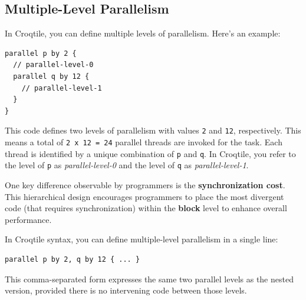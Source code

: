 \subsection*{Multiple-Level Parallelism}

In Croqtile, you can define multiple levels of parallelism. Here's an example:

\begin{lstlisting}[language=croqtile,caption={One parallel level}]
parallel p by 2 {
  // parallel-level-0
  parallel q by 12 {
    // parallel-level-1
  }
}
\end{lstlisting}

This code defines two levels of parallelism with values \texttt{2} and \texttt{12}, respectively. This means a total of \texttt{2 x 12 = 24} parallel threads are invoked for the task. Each thread is identified by a unique combination of \texttt{p} and \texttt{q}. In Croqtile, you refer to the level of \texttt{p} as \emph{parallel-level-0} and the level of \texttt{q} as \emph{parallel-level-1}.

One key difference observable by programmers is the \textbf{synchronization cost}. This hierarchical design encourages programmers to place the most divergent code (that requires synchronization) within the \textbf{block} level to enhance overall performance.

In Croqtile syntax, you can define multiple-level parallelism in a single line:

\begin{lstlisting}[language=croqtile,caption={Two parallel levels}]
parallel p by 2, q by 12 { ... }
\end{lstlisting}

This comma-separated form expresses the same two parallel levels as the nested version, provided there is no intervening code between those levels.
